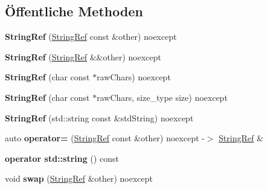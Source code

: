 \subsection*{Öffentliche Methoden}
\begin{DoxyCompactItemize}
\item 
\mbox{\label{classCatch_1_1StringRef_a2f287267c3a988b288bfd910667c1cfc}} 
{\bfseries String\+Ref} (\hyperlink{classCatch_1_1StringRef}{String\+Ref} const \&other) noexcept
\item 
\mbox{\label{classCatch_1_1StringRef_a407d5737b94e5a374add5c2794589733}} 
{\bfseries String\+Ref} (\hyperlink{classCatch_1_1StringRef}{String\+Ref} \&\&other) noexcept
\item 
\mbox{\label{classCatch_1_1StringRef_aea45f5089c53adac362bff6bd7c40943}} 
{\bfseries String\+Ref} (char const $\ast$raw\+Chars) noexcept
\item 
\mbox{\label{classCatch_1_1StringRef_a320bf235274ebb90dd6af80485af2797}} 
{\bfseries String\+Ref} (char const $\ast$raw\+Chars, size\+\_\+type size) noexcept
\item 
\mbox{\label{classCatch_1_1StringRef_a7fe41469048f906e9a847798cd335f23}} 
{\bfseries String\+Ref} (std\+::string const \&std\+String) noexcept
\item 
\mbox{\label{classCatch_1_1StringRef_a14d5a1983e33c51c6b5fd33bffbebabb}} 
auto {\bfseries operator=} (\hyperlink{classCatch_1_1StringRef}{String\+Ref} const \&other) noexcept -\/$>$ \hyperlink{classCatch_1_1StringRef}{String\+Ref} \&
\item 
\mbox{\label{classCatch_1_1StringRef_ad9fde21785affacc32d7da7a70d74e93}} 
{\bfseries operator std\+::string} () const
\item 
\mbox{\label{classCatch_1_1StringRef_a8a843e39ad3560d10a80524ed926ed63}} 
void {\bfseries swap} (\hyperlink{classCatch_1_1StringRef}{String\+Ref} \&other) noexcept
\item 
\mbox{\label{classCatch_1_1StringRef_aabb30149ab961187e4b3ff3394bf6e73}} 

\end{DoxyCompactItemize}
